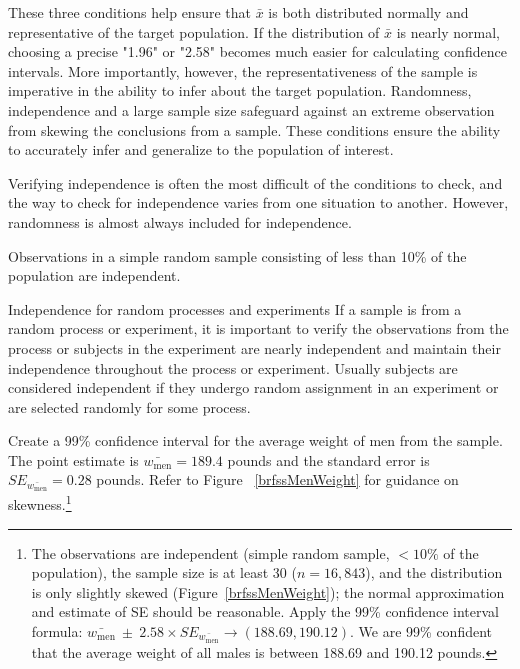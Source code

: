 These three conditions help ensure that $\bar{x}$ is both distributed normally and representative of the target population. If the distribution of $\bar{x}$ is nearly normal, choosing a precise "1.96" or "2.58" becomes much easier for calculating confidence intervals. More importantly, however, the representativeness of the sample is imperative in the ability to infer about the target population. Randomness, independence and a large sample size safeguard against an extreme observation from skewing the conclusions from a sample. These conditions ensure the ability to accurately infer and generalize to the population of interest.

Verifying independence is often the most difficult of the conditions to check, and the way to check for independence varies from one situation to another. However, randomness is almost always included for independence. 

\begin{tipBox}{
Observations in a simple random sample consisting of less than 10\% of the population are independent.}
\end{tipBox}

\begin{caution}
{Independence for random processes and experiments}
{If a sample is from a random process or experiment, it is important to verify the observations from the process or subjects in the experiment are nearly independent and maintain their independence throughout the process or experiment. Usually subjects are considered independent if they undergo random assignment in an experiment or are selected randomly for some process.}
\end{caution}

\begin{exercise} \label{find99CIForBRFSSWeightExercise}
Create a 99\% confidence interval for the average weight of men from the  sample. The point estimate is $\bar{w_{\mathrm{men}}} = 189.4$ pounds and the standard error is $SE_{\bar{w_{\mathrm{men}}}} = 0.28$ pounds. Refer to Figure ~\ref{brfssMenWeight} for guidance on skewness.\footnote{The observations are independent (simple random sample, $<10\%$ of the population), the sample size is at least 30 ($n=16,843$), and the distribution is only slightly skewed (Figure~\ref{brfssMenWeight}); the normal approximation and estimate of SE should be reasonable.  Apply the 99\% confidence interval formula: $\bar{w_{\mathrm{men}}}\ \pm\ 2.58 \times  SE_{\bar{w_{\mathrm{men}}}} \rightarrow (188.69, 190.12)$. We are 99\% confident that the average weight of all males is between 188.69 and 190.12 pounds.}
\end{exercise}

